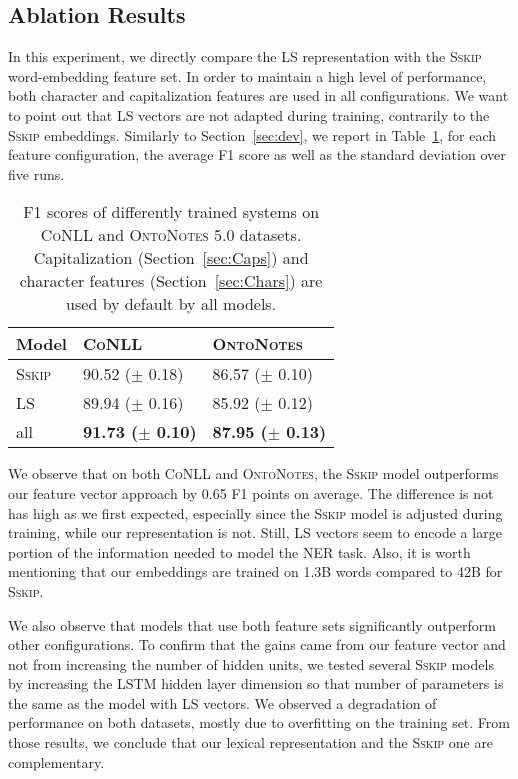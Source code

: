 \documentclass[11pt]{article}
\newcommand{\conll}{\textsc{CoNLL}}
\newcommand{\onto}{\textsc{OntoNotes}}
\newcommand{\sskip}{\textsc{Sskip}}
\newcommand{\lr}{\textsc{LS}}
\begin{document}
	\subsection{Ablation Results}
	In this experiment, we directly compare the \lr{} representation with the \sskip{} word-embedding feature set. In order to maintain a high level of performance, both character and capitalization features are used in all configurations. We want to point out that \lr{} vectors are not adapted during training, contrarily to the \sskip{} embeddings. Similarly to Section~\ref{sec:dev}, we report in Table~\ref{tab:ablation}, for each feature configuration, the average F1 score as well as the standard deviation over five runs.
	
	\begin{table}[h]
		\setlength{\tabcolsep}{2mm} 
		\begin{center} 
			\begin{tabular}{|l|l|l|}
				\hline 
				\textbf{Model} & \textbf{\conll}  & \textbf{\onto}\\ 
				\hline
				\sskip              & 90.52 ($\pm$ 0.18) & 86.57 ($\pm$ 0.10) \\
				\lr & 89.94 ($\pm$ 0.16) & 85.92 ($\pm$ 0.12) \\
				\hline
				all                     & \bf 91.73  ($\pm$ 0.10) & \bf 87.95 ($\pm$ 0.13) \\
				\hline
			\end{tabular}
			
		\end{center}
		\caption{F1 scores of differently trained systems  on \conll{ } and \onto{ 5.0} datasets. Capitalization (Section~\ref{sec:Caps})  and character features  (Section~\ref{sec:Chars})  are used by default by all models.}
		
		\label{tab:ablation} 
	\end{table}		
	
	
	We observe that on both \conll{} and \onto{}, the \sskip{} model outperforms our feature vector approach by 0.65 F1 points on average. The difference is not has high as we first expected, especially since the \sskip{} model is adjusted during training, while our representation is not.	Still, \lr{} vectors seem to  encode a large portion of the information needed to model the NER task. Also, it is worth mentioning that our embeddings are trained on 1.3B words compared to 42B for \sskip.
	
	We also observe  that models that use both feature sets significantly outperform other configurations. To confirm that the gains came from our feature vector and not from increasing the number of hidden units, we tested several \sskip{} models by increasing the LSTM hidden layer dimension so that number of parameters is the same as the model with \lr{} vectors. We observed a degradation of performance on both datasets, mostly due to overfitting on the training set. From those results, we conclude that our lexical representation and the \sskip{} one are complementary. 
	
\end{document}
